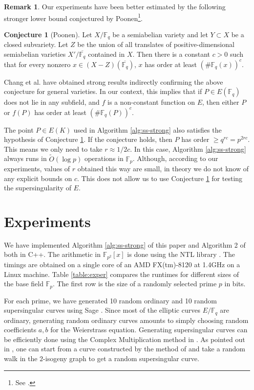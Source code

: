 \documentclass[12pt]{article}
\theoremstyle{plain}
\theoremstyle{definition}
\newtheorem{conjecture}[theorem]{Conjecture}
\newtheorem*{remark}{Remark}
\newcommand{\tildO}{\tilde{O}}
\def\F{\ensuremath{\mathbb{F}}}
\begin{document}
\begin{remark}
	Our experiments have been better estimated by the following stronger lower bound conjectured by 
	Poonen\footnote{See \cite{voloch2007}.}.
	\begin{conjecture}[Poonen]
		\label{conj:poonen}
		Let $X/\F_q$ be a semiabelian variety and let $Y \subset X$ be a closed subvariety. Let $Z$ 
		be the union of all translates of positive-dimensional semiabelian varieties $X' / 
		\overline{\F_q}$ contained in $X$. Then there is a constant $c > 0$ such that for every 
		nonzero $x \in (X - Z)(\overline{\F_q})$, $x$ has order at least $(\#\F_q(x))^c$.
	\end{conjecture}
	Chang et al.\cite{chang2014} have obtained strong results indirectly confirming the above 
	conjecture for general varieties. In our context, this implies that if $P \in E(\F_q)$ does 
	not lie in any subfield, and $f$ is a non-constant function on $E$, then either $P$ or $f(P)$ 
	has order at least $(\#\F_q(P))^c$. 
	
	The point $P \in E(K)$ used in Algorithm \ref{alg:ss-strong} also satisfies the hypothesis of 
	Conjecture \ref{conj:poonen}. If the conjecture holds, then $P$ has order $\ge q^{rc} = 
	p^{2rc}$. This means we only need to take $r \approx 1 / 2c$. In this case, Algorithm 
	\ref{alg:ss-strong} always runs in $\tildO(\log p)$ operations in $\F_p$. Although, according 
	to our experiments, values of $r$ obtained this way are small, in theory we do not know of any 
	explicit bounds on $c$. This does not allow us to use Conjecture \ref{conj:poonen} for testing 
	the supersingularity of $E$.
\end{remark}




\section{Experiments}

We have implemented Algorithm \ref{alg:ss-strong} of this paper and Algorithm 2 of 
\cite{sutherland2012} both in C++. The arithmetic in $\F_{p^2}[x]$ is done using the NTL library 
\cite{shoup2001ntl}. The timings are obtained on a single core of an AMD FX(tm)-8120 at 1.4GHz on a 
Linux machine. Table \ref{table:exper} compares the runtimes for different sizes of the base field 
$\F_p$. The first row is the size of a randomly selected prime $p$ in bits. 

For each prime, we have generated 10 random ordinary and 10 random supersingular curves using Sage 
\cite{stein2008sage}. Since most of the elliptic curves $E/\F_q$ are ordinary, generating random 
ordinary curves amounts to simply choosing random coefficients $a, b$ for the Weierstrass equation. 
Generating supersingular curves can be efficiently done using the Complex Multiplication 
method in \cite{broker2009}. As pointed out in \cite{sutherland2012}, one can start from a curve 
constructed by the method of \cite{broker2009} and take a random walk in the $2$-isogeny graph to 
get a random supersingular curve.
\end{document}
